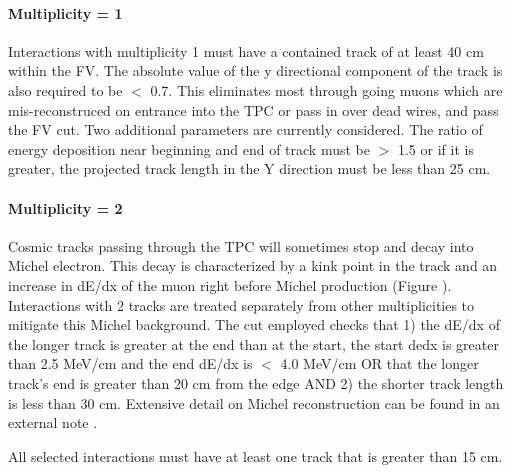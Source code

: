 \documentclass[12pt]{article}
\begin{document}
\paragraph{Multiplicity = 1}
\par Interactions with multiplicity 1 must have a contained track of at least 40 cm within the FV. The absolute value of the y directional component of the track is also required to be $<$ 0.7.  This eliminates most through going muons which are mis-reconstruced on entrance into the TPC or pass in over dead wires, and pass the FV cut. Two additional parameters are currently considered.  The ratio of energy deposition near beginning and end of track must be $>$ 1.5 or if it is greater, the projected track length in the Y direction must be less than 25 cm.
\paragraph{Multiplicity = 2}
\par Cosmic tracks passing through the TPC will sometimes stop and decay into Michel electron. This decay is characterized by a kink point in the track and an increase in dE/dx of the muon right before Michel production (Figure \cite{fig:michel}).  Interactions with 2 tracks are treated separately from other multiplicities to mitigate this Michel background. The cut employed checks that 1) the dE/dx of the longer track is greater at the end than at the start, the start dedx is greater than 2.5 MeV/cm and the end dE/dx is $<$ 4.0 MeV/cm OR that the longer track's end is greater than 20 cm from the edge AND 2) the shorter track length is less than 30 cm.  Extensive detail on Michel reconstruction can be found in an external note \cite{bib:michel}. 
\par All selected interactions must have at least one track that is greater than 15 cm.
\end{document}
